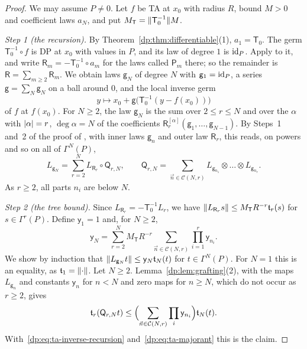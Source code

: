 \begin{proof}
We may assume $P\ne0$. Let $f$ be TA at $x_0$ with radius $R$, bound $M>0$ and coefficient laws $a_N$, and put $M_{\mathsf T}=\lVert \mathsf T_0^{-1}\rVert M$.

\emph{Step 1 (the recursion).} By Theorem~\ref{dp:thm:differentiable}(1), $a_1=\mathsf T_0$. The germ $\mathsf T_0^{-1}\circ f$ is DP at $x_0$ with values in $P$, and its law of degree $1$ is $\mathrm{id}_P$. Apply \cite[Lemma~Q.14]{I} to it, and write $\mathsf R_m=-\mathsf T_0^{-1}\circ a_m$ for the laws called $\mathsf P_m$ there; so the remainder is $\mathsf R=\sum_{m\ge2}\mathsf R_m$. We obtain laws $\mathsf g_N$ of degree $N$ with $\mathsf g_1=\mathrm{id}_P$, a series $\mathsf g=\sum_N\mathsf g_N$ on a ball around $0$, and the local inverse germ
\begin{equation}\label{dp:eq:ta-inverse-germ}
 y\longmapsto x_0+\mathsf g\bigl(\mathsf T_0^{-1}(y-f(x_0))\bigr)
\end{equation}
of $f$ at $f(x_0)$. For $N\ge2$, the law $\mathsf g_N$ is the sum over $2\le r\le N$ and over the $\alpha$ with $\lvert \alpha\rvert=r$, $\deg\alpha=N$ of the coefficients $\mathsf R_r^{[\alpha]}(\mathsf g_1,\dots,\mathsf g_{N-1})$. By Steps~1 and~2 of the proof of \cite[Lemma~Q.4]{I}, with inner laws $\mathsf g_n$ and outer law $\mathsf R_r$, this reads, on powers and so on all of $\Gamma^N(P)$,
\begin{equation}\label{dp:eq:ta-inverse-recursion}
 L_{\mathsf g_N}=\sum_{r=2}^NL_{\mathsf R_r}\circ\mathsf Q_{r,N},\qquad
 \mathsf Q_{r,N}=\sum_{\vec n\in\mathcal C(N,r)}L_{\mathsf g_{n_1}}\otimes\dots\otimes L_{\mathsf g_{n_r}}.
\end{equation}
As $r\ge2$, all parts $n_i$ are below $N$.

\emph{Step 2 (the tree bound).} Since $L_{\mathsf R_r}=-\mathsf T_0^{-1}L_r$, we have $\lVert L_{\mathsf R_r}s\rVert\le M_{\mathsf T}R^{-r}\mathfrak t_r(s)$ for $s\in\Gamma^r(P)$. Define $\mathsf y_1=1$ and, for $N\ge2$,
\begin{equation}\label{dp:eq:ta-majorant}
 \mathsf y_N=\sum_{r=2}^NM_{\mathsf T}R^{-r}\sum_{\vec n\in\mathcal C(N,r)}\prod_{i=1}^r\mathsf y_{n_i}.
\end{equation}
We show by induction that $\lVert L_{\mathsf g_N}t\rVert\le\mathsf y_N\mathfrak t_N(t)$ for $t\in\Gamma^N(P)$. For $N=1$ this is an equality, as $\mathfrak t_1=\lVert \cdot\rVert$. Let $N\ge2$. Lemma~\ref{dp:lem:grafting}(2), with the maps $L_{\mathsf g_n}$ and constants $\mathsf y_n$ for $n<N$ and zero maps for $n\ge N$, which do not occur as $r\ge2$, gives
\[
 \mathfrak t_r(\mathsf Q_{r,N}t)\le\Bigl(\sum_{\vec n\in\mathcal C(N,r)}\prod_i\mathsf y_{n_i}\Bigr)\mathfrak t_N(t).
\]
With~\eqref{dp:eq:ta-inverse-recursion} and~\eqref{dp:eq:ta-majorant} this is the claim.


\end{proof}
